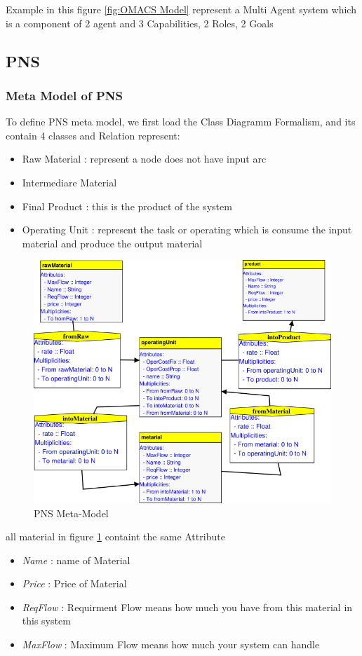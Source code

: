 Example in this figure \ref{fig:OMACS Model} represent a Multi Agent system which is  a component of 2 agent and 3 Capabilities, 2 Roles, 2 Goals

\subsection{PNS} 
\subsubsection{Meta Model of PNS}
To define PNS meta model, we first load the Class Diagramm Formalism, and its contain 4 classes and Relation
represent: 
\begin{itemize}
	\item Raw Material : represent a node does not have input arc 
	\item Intermediare Material 
	\item Final Product : this is the product of the system 
	\item Operating Unit : represent the task or operating which is consume the input material and produce the output material 
\end{itemize}
\pagebreak
\begin{figure}[th] 

	\centering
 	\includegraphics[scale=0.7]{ch3/img/pns_meta}
	\caption{\label{fig:PNS Meta-Model}PNS Meta-Model}
	
\end{figure} 

all material in figure \ref{fig:PNS Meta-Model} containt the same Attribute
\begin{itemize}


\item \textit{Name} : name of Material 
\item \textit{Price} : Price of Material
\item \textit{ReqFlow} : Requirment Flow means how much you have from this material in this system
\item \textit{MaxFlow} : Maximum Flow means how much your system can handle

\end{itemize}



